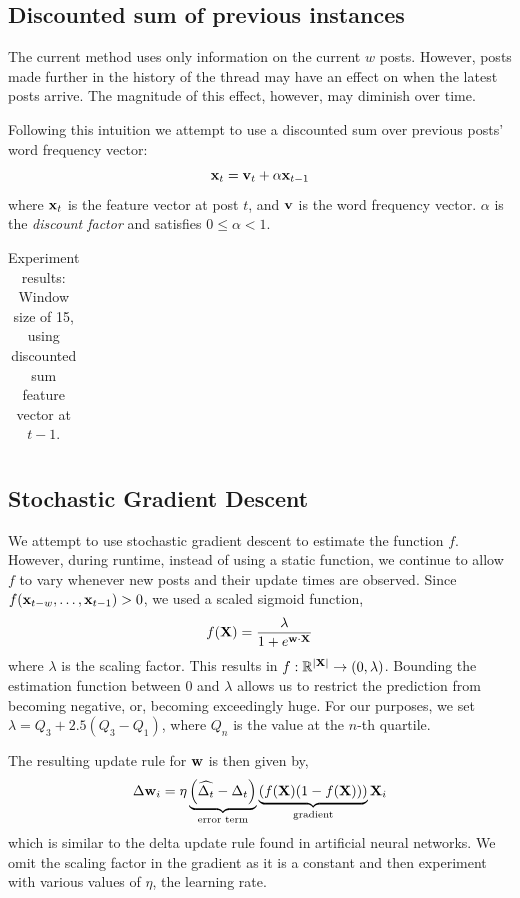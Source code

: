 \documentclass[12 pt]{article}
\begin{document}
\subsection{Discounted sum of previous instances}

The current method uses only information on the current $w$ posts. However, posts made further in the history of the thread may have an effect on when the latest posts arrive. The magnitude of this effect, however, may diminish over time.

Following this intuition we attempt to use a discounted sum over previous posts' word frequency vector:
\[
	\mathbf{x}_t = \mathbf{v}_t + \alpha \mathbf{x}_{t-1}
\]
where $\mathbf{x}_t$ is the feature vector at post $t$, and $\mathbf{v}$ is the word frequency vector. $\alpha$ is the \emph{discount factor} and satisfies $0 \leq \alpha < 1$.


\begin{table}
	\footnotesize
	\begin{centering}
	\begin{tabular}{|l|c|c|c|c|c|c|c|c|}
	\hline
	
	\hline
	\end{tabular}
	\caption{Experiment results: Window size of 15, using discounted sum feature vector at $t-1$.}
	\label{exp_decay}
\end{centering}
\end{table}

\subsection{Stochastic Gradient Descent}

We attempt to use stochastic gradient descent to estimate the function $f$. However, during runtime, instead of using a static function, we continue to allow $f$ to vary whenever new posts and their update times are observed.
Since $f(\mathbf{x}_{t-w},\hdots,\mathbf{x}_{t-1}) > 0$, we used a scaled sigmoid function,
\[
	f(\mathbf{X}) = \frac{\lambda}{1 + e^{\mathbf{w} \cdot \mathbf{X}}}
\]
where $\lambda$ is the scaling factor. This results in $f: \mathbb{R}^{|\mathbf{X}|}  \rightarrow (0,\lambda)$. Bounding the estimation function between $0$ and $\lambda$ allows us to restrict the prediction from becoming negative, or, becoming exceedingly huge. For our purposes, we set $\lambda = Q_3 + 2.5(Q_{3} - Q_{1})$, where $Q_n$ is the value at the $n$-th quartile. 

The resulting update rule for $\mathbf{w}$ is then given by,
\[
	\Delta \mathbf{w}_i = \eta
				\underbrace{\left(\widehat{\Delta_t} - \Delta_t \right)}_{\text{error term}}
				\underbrace{\left( f(\mathbf{X})(1-f(\mathbf{X})) \right)}_{\text{gradient}}
						\mathbf{X}_i
\]
which is similar to the delta update rule found in artificial neural networks. We omit the scaling factor in the gradient as it is a constant and then experiment with various values of $\eta$, the learning rate.


\end{document}
